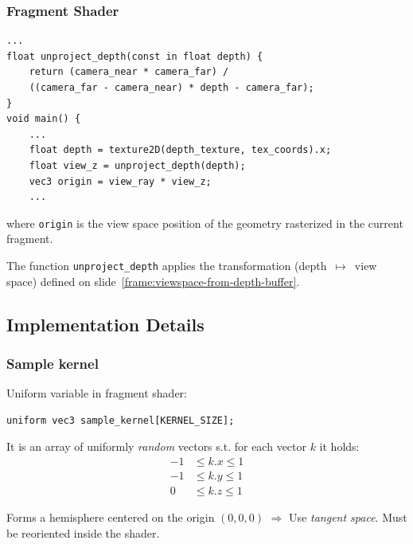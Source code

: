 \documentclass{beamer}
\begin{document}
\begin{frame}[fragile]
\frametitle{Fragment Shader}
\begin{verbatim}
...
float unproject_depth(const in float depth) {
    return (camera_near * camera_far) /
    ((camera_far - camera_near) * depth - camera_far);
}
void main() {
    ...
    float depth = texture2D(depth_texture, tex_coords).x;
    float view_z = unproject_depth(depth);
    vec3 origin = view_ray * view_z;
    ...
\end{verbatim}
where \texttt{origin} is the view space position of the geometry rasterized in the current fragment.

The function \texttt{unproject_depth} applies the transformation (depth~$ \mapsto $~view space) defined on slide~\ref{frame:viewspace-from-depth-buffer}.

\end{frame}

\subsection{Implementation Details}

\begin{frame}[fragile]
\frametitle{Sample kernel}
Uniform variable in fragment shader:
\begin{verbatim}
uniform vec3 sample_kernel[KERNEL_SIZE];
\end{verbatim}

It is an array of uniformly \emph{random} vectors s.t. for each vector $ k $ it holds:
\begin{align*}
-1 & \le k.x \le 1 \\
-1 & \le k.y \le 1 \\
0 & \le k.z \le 1
\end{align*}

Forms a hemisphere centered on the origin $ (0, 0, 0) $ $ \Rightarrow $ Use \emph{tangent space}. Must be reoriented inside the shader.
\end{frame}
\end{document}
